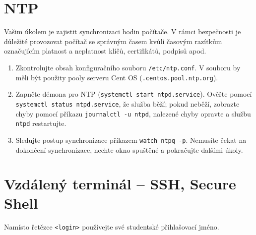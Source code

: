 \documentclass[a4paper,11pt]{article}
\begin{document}
\section{NTP}

Vašim úkolem je zajistit synchronizaci hodin počítače.
V rámci bezpečnosti je důležité provozovat počítač se správným časem kvůli časovým razítkům označujícím platnost a neplatnost klíčů, certifikátů, podpisů apod.

\begin{enumerate}

  \item Zkontrolujte obsah konfiguračního souboru {\tt /etc/ntp.conf}.
    V souboru by měli být použity pooly serveru Cent OS ({\tt *.centos.pool.ntp.org}).

  \item Zapněte démona pro NTP ({\tt systemctl start ntpd.service}).
    Ověřte pomocí {\tt systemctl status ntpd.service}, že služba běží;
    pokud neběží, zobrazte chyby pomocí příkazu {\tt journalctl -u ntpd}, nalezené chyby opravte a službu {\tt ntpd} restartujte.

  \item Sledujte postup synchronizace příkazem {\tt watch ntpq -p}.
    Nemusíte čekat na dokončení synchronizace, nechte okno spuštěné a pokračujte dalšími úkoly.

\end{enumerate}

\section{Vzdálený terminál -- SSH, Secure Shell}

Namísto řetězce {\tt <login>} používejte své studentské přihlašovací jméno.
\end{document}
